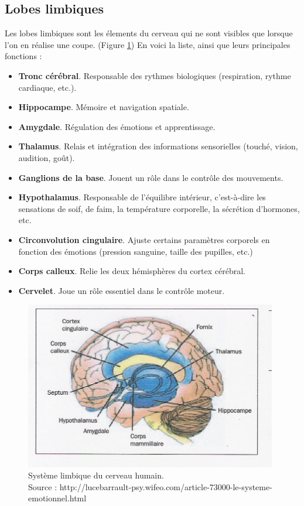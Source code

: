 \subsection{Lobes limbiques}
\label{Subsection: 2.Lobes limbiques}

Les lobes limbiques sont les élements du cerveau qui ne sont visibles que lorsque l'on en réalise une coupe. (Figure \ref{fig:limbique})
En voici la liste, ainsi que leurs principales fonctions : 

\begin{itemize}
	\item \textbf{Tronc cérébral}. Responsable des rythmes biologiques (respiration, rythme cardiaque, etc.).
	\smallbreak
	\item \textbf{Hippocampe}. Mémoire et navigation spatiale. 
	\smallbreak
	\item \textbf{Amygdale}. Régulation des émotions et apprentissage. 
	\smallbreak
	\item \textbf{Thalamus}. Relais et intégration des informations sensorielles (touché, vision, audition, goût).
	\smallbreak
	\item \textbf{Ganglions de la base}. Jouent un rôle dans le contrôle des mouvements. 
	\smallbreak
	\item \textbf{Hypothalamus}. Responsable de l'équilibre intérieur, c'est-à-dire les sensations de soif, de faim, la température corporelle, la sécrétion d'hormones, etc. 
	\smallbreak
	\item \textbf{Circonvolution cingulaire}. Ajuste certains paramètres corporels en fonction des émotions (pression sanguine, taille des pupilles, etc.)
	\smallbreak
	\item \textbf{Corps calleux}. Relie les deux hémisphères du cortex cérébral. 
	\smallbreak
	\item \textbf{Cervelet}. Joue un rôle essentiel dans le contrôle moteur.
\end{itemize}

\smallbreak
\begin{figure}[h]
	\centering\includegraphics[width=11cm]{images/lobesLimbiques.jpg}
	\caption[Système limbique du cerveau humain.]{Système limbique du cerveau humain.\\Source : http://lucebarrault-psy.wifeo.com/article-73000-le-systeme-emotionnel.html}
	\label{fig:limbique}
\end{figure}

